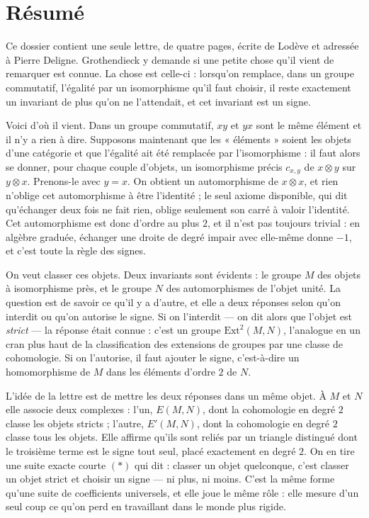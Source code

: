 \documentclass[11pt,a4paper]{article}
\begin{document}
\section*{Résumé}

\begin{resume}
Ce dossier contient une seule lettre, de quatre pages, écrite de Lodève et
adressée à Pierre Deligne. Grothendieck y demande si une petite chose qu'il
vient de remarquer est connue. La chose est celle-ci : lorsqu'on remplace,
dans un groupe commutatif, l'égalité par un isomorphisme qu'il faut choisir,
il reste exactement un invariant de plus qu'on ne l'attendait, et cet
invariant est un signe.

Voici d'où il vient. Dans un groupe commutatif, $xy$ et $yx$ sont le même
élément et il n'y a rien à dire. Supposons maintenant que les « éléments »
soient les objets d'une catégorie et que l'égalité ait été remplacée par
l'isomorphisme : il faut alors se donner, pour chaque couple d'objets, un
isomorphisme précis $c_{x,y}$ de $x \otimes y$ sur $y \otimes x$. Prenons-le
avec $y = x$. On obtient un automorphisme de $x \otimes x$, et rien n'oblige
cet automorphisme à être l'identité ; le seul axiome disponible, qui dit
qu'échanger deux fois ne fait rien, oblige seulement son carré à valoir
l'identité. Cet automorphisme est donc d'ordre au plus $2$, et il n'est pas
toujours trivial : en algèbre graduée, échanger une droite de degré impair
avec elle-même donne $-1$, et c'est toute la règle des signes.

On veut classer ces objets. Deux invariants sont évidents : le groupe $M$ des
objets à isomorphisme près, et le groupe $N$ des automorphismes de l'objet
unité. La question est de savoir ce qu'il y a d'autre, et elle a deux
réponses selon qu'on interdit ou qu'on autorise le signe. Si on l'interdit
--- on dit alors que l'objet est \emph{strict} --- la réponse était connue :
c'est un groupe $\mathrm{Ext}^2(M,N)$, l'analogue en un cran plus haut de la
classification des extensions de groupes par une classe de cohomologie. Si on
l'autorise, il faut ajouter le signe, c'est-à-dire un homomorphisme de $M$
dans les éléments d'ordre $2$ de $N$.

L'idée de la lettre est de mettre les deux réponses dans un même objet. À
$M$ et $N$ elle associe deux complexes : l'un, $E(M,N)$, dont la cohomologie
en degré $2$ classe les objets stricts ; l'autre, $E'(M,N)$, dont la
cohomologie en degré $2$ classe tous les objets. Elle affirme qu'ils sont
reliés par un triangle distingué dont le troisième terme est le signe tout
seul, placé exactement en degré $2$. On en tire une suite exacte courte $(*)$
qui dit : classer un objet quelconque, c'est classer un objet strict et
choisir un signe --- ni plus, ni moins. C'est la même forme qu'une suite de
coefficients universels, et elle joue le même rôle : elle mesure d'un seul
coup ce qu'on perd en travaillant dans le monde plus rigide.


\end{resume}
\end{document}
